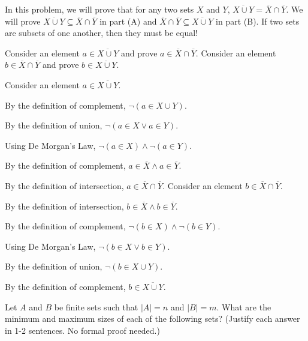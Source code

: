 \documentclass[solution, letterpaper]{cs20}
\begin{document}


In this problem, we will prove that for any two sets $X$ and $Y$, $\overline{X \cup Y} = \overline{X} \cap \overline{Y}$. We will prove $\overline{X \cup Y} \subseteq \overline{X} \cap \overline{Y}$ in part (A) and $\overline{X} \cap \overline{Y} \subseteq \overline{X \cup Y}$ in part (B). If two sets are subsets of one another, then they must be equal!

\subproblem Consider an element $a \in \overline{X \cup Y}$ and prove $a \in \overline{X} \cap \overline{Y}$.
\subproblem Consider an element $b \in \overline{X} \cap \overline{Y}$ and prove $b \in \overline{X \cup Y}$.

\begin{solution}
\subsolution Consider an element $a \in \overline{X \cup Y}$. 

By the definition of complement, $\neg (a \in X \cup Y)$. 

By the definition of union, $\neg (a \in X \vee a \in Y)$. 

Using De Morgan's Law, $\neg (a \in X) \wedge \neg (a \in Y)$. 

By the definition of complement, $a \in \overline{X} \wedge a \in \overline{Y}$.

By the definition of intersection, $a \in \overline{X} \cap \overline{Y}$.
\subsolution Consider an element $b \in \overline{X} \cap \overline{Y}$.

By the definition of intersection, $b \in \overline{X} \wedge b \in \overline{Y}$.

By the definition of complement, $\neg (b \in X) \wedge \neg (b \in Y)$.

Using De Morgan's Law, $\neg (b \in X \vee b \in Y)$.

By the definition of union, $\neg (b \in X \cup Y)$.

By the definition of complement, $b \in \overline{X \cup Y}$.

\end{solution}

Let $A$ and $B$ be finite sets such that $|A| = n$ and $|B| = m$. What are the minimum and maximum sizes of each of the following sets? (Justify each answer in 1-2 sentences. No formal proof needed.)
\end{document}
